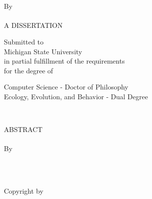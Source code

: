 \documentclass[12pt,letterpaper,twoside]{report}
\begin{document}
\sloppy
{}


\begin{titlepage}
\begin{center}
\ \\[1in]%
\MakeUppercase{\thesisTitle}\\
\begin{doublespace}
By\\ %
\authorName \\[4.5 in]%
A DISSERTATION \\ %
\end{doublespace}

Submitted to \\ Michigan State University \\ in partial
fulfillment of the requirements \\ 
for the degree of\\
\begin{doublespace}
\end{doublespace}


Computer Science - Doctor of Philosophy \\
Ecology, Evolution, and Behavior - Dual Degree

\graduationYear\\

\end{center}
\end{titlepage}
\newpage

\thispagestyle{empty} \setcounter{page}{2}
\begin{doublespace}
\begin{centering}
ABSTRACT \\ %
\MakeUppercase{\thesisTitle} \\ %
By \\ %
\authorName \\ %
\end{centering}



\end{doublespace}
\newpage
\addtocounter{page}{-2}%

\thispagestyle{empty}
\mbox{}\vspace{6in}\\
\begin{flushright}
Copyright by \\
\MakeUppercase{\authorName} \\
\graduationYear \\
\end{flushright}
\newpage
\end{document}
